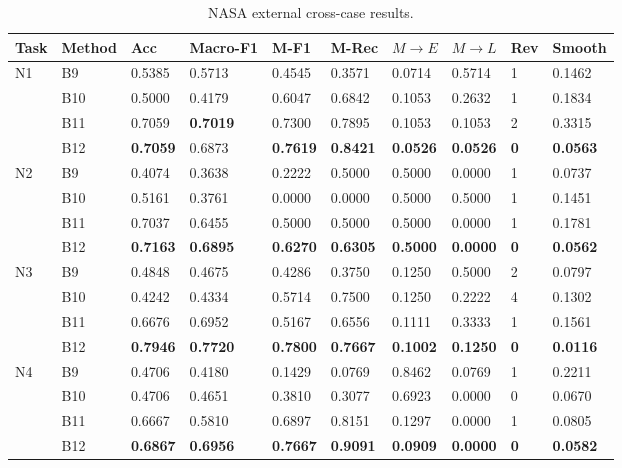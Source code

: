 \documentclass[a4paper,fleqn]{cas-sc}
\begin{document}
  \begin{table}[!htbp]
    \centering
    \scriptsize
  \caption{NASA external cross-case results.}
    \label{tab:11}
    \begin{adjustbox}{max width=\textwidth}
      \begin{tabular}{llllllllll}
        \toprule
        \textbf{Task} & \textbf{Method} & \textbf{Acc} & \textbf{Macro-F1} & \textbf{M-F1} & \textbf{M-Rec} & \textbf{$M\rightarrow E$} & \textbf{$M\rightarrow L$} & \textbf{Rev} & \textbf{Smooth} \\
        \midrule
        N1 & B9 & 0.5385 & 0.5713 & 0.4545 & 0.3571 & 0.0714 & 0.5714 & 1 & 0.1462 \\
        & B10 & 0.5000 & 0.4179 & 0.6047 & 0.6842 & 0.1053 & 0.2632 & 1 & 0.1834 \\
        & B11 & 0.7059 & \textbf{0.7019} & 0.7300 & 0.7895 & 0.1053 & 0.1053 & 2 & 0.3315 \\
        & B12 & \textbf{0.7059} & 0.6873 & \textbf{0.7619} & \textbf{0.8421} & \textbf{0.0526} & \textbf{0.0526} & \textbf{0} & \textbf{0.0563} \\
        N2 & B9 & 0.4074 & 0.3638 & 0.2222 & 0.5000 & 0.5000 & 0.0000 & 1 & 0.0737 \\
        & B10 & 0.5161 & 0.3761 & 0.0000 & 0.0000 & 0.5000 & 0.5000 & 1 & 0.1451 \\
        & B11 & 0.7037 & 0.6455 & 0.5000 & 0.5000 & 0.5000 & 0.0000 & 1 & 0.1781 \\
        & B12 & \textbf{0.7163} & \textbf{0.6895} & \textbf{0.6270} & \textbf{0.6305} & \textbf{0.5000} & \textbf{0.0000} & \textbf{0} & \textbf{0.0562} \\
        N3 & B9 & 0.4848 & 0.4675 & 0.4286 & 0.3750 & 0.1250 & 0.5000 & 2 & 0.0797 \\
        & B10 & 0.4242 & 0.4334 & 0.5714 & 0.7500 & 0.1250 & 0.2222 & 4 & 0.1302 \\
        & B11 & 0.6676 & 0.6952 & 0.5167 & 0.6556 & 0.1111 & 0.3333 & 1 & 0.1561 \\
        & B12 & \textbf{0.7946} & \textbf{0.7720} & \textbf{0.7800} & \textbf{0.7667} & \textbf{0.1002} & \textbf{0.1250} & \textbf{0} & \textbf{0.0116} \\
        N4 & B9 & 0.4706 & 0.4180 & 0.1429 & 0.0769 & 0.8462 & 0.0769 & 1 & 0.2211 \\
        & B10 & 0.4706 & 0.4651 & 0.3810 & 0.3077 & 0.6923 & 0.0000 & 0 & 0.0670 \\
        & B11 & 0.6667 & 0.5810 & 0.6897 & 0.8151 & 0.1297 & 0.0000 & 1 & 0.0805 \\
        & B12 & \textbf{0.6867} & \textbf{0.6956} & \textbf{0.7667} & \textbf{0.9091} & \textbf{0.0909} & \textbf{0.0000} & \textbf{0} & \textbf{0.0582} \\
        \bottomrule
      \end{tabular}
    \end{adjustbox}
  \end{table}
\end{document}
